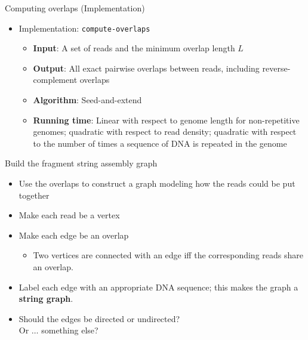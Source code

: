 \documentclass[xcolor=dvipsnames]{beamer}
\newcommand{\LengthVar}{L}
\begin{document}
\begin{frame}{Computing overlaps (Implementation)}
	\begin{itemize}
		\item Implementation: {\tt compute-overlaps}
			\begin{itemize}
				\item {\bf Input}:  A set of reads and the minimum overlap
				length $\LengthVar$
				\item {\bf Output}:  All exact pairwise overlaps between reads,
				including reverse-complement overlaps
				\item {\bf Algorithm}:  Seed-and-extend
				\item {\bf Running time}: Linear with respect to genome length
				for non-repetitive genomes; quadratic with respect to read
					density; quadratic with respect to the number of times a
					sequence of DNA is repeated in the genome
			\end{itemize}
	\end{itemize}
\end{frame}

\begin{frame}{Build the fragment string assembly graph}
	\begin{itemize}

		\item Use the overlaps to construct a graph modeling how the reads could
		be put together
		\item Make each read be a vertex
		\item Make each edge be an overlap
		\begin{itemize}
			\item Two vertices are connected with an edge iff the
			corresponding reads share an overlap.
		\end{itemize}
		\item Label each edge with an appropriate DNA sequence; this makes the
		graph a {\bf string graph}.
		\item Should the edges be directed or undirected?  \\Or $\dots$ something
		else?
	\end{itemize}
\end{frame}
\end{document}
